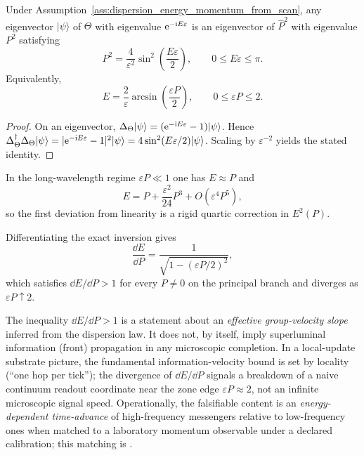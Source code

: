 \begin{proposition}
\label{prop:dispersion_exact}
\MathTag Under Assumption~\ref{ass:dispersion_energy_momentum_from_scan}, any eigenvector $|\psi\rangle$ of $\Theta$ with eigenvalue $\mathrm{e}^{-\mathrm{i} E\varepsilon}$ is an eigenvector of $\widehat{P}^2$ with eigenvalue $P^2$ satisfying
\[
P^2=\frac{4}{\varepsilon^2}\sin^2\!\left(\frac{E\varepsilon}{2}\right),
\qquad 0\le E\varepsilon\le\pi.
\]
Equivalently,
\[
E=\frac{2}{\varepsilon}\arcsin\!\left(\frac{\varepsilon P}{2}\right),
\qquad 0\le \varepsilon P\le 2.
\]
\end{proposition}
\begin{proof}
On an eigenvector, $\Delta_\Theta|\psi\rangle=(\mathrm{e}^{-\mathrm{i} E\varepsilon}-1)|\psi\rangle$.
Hence $\Delta_\Theta^\dagger\Delta_\Theta|\psi\rangle=|\mathrm{e}^{-\mathrm{i} E\varepsilon}-1|^2|\psi\rangle=4\sin^2(E\varepsilon/2)|\psi\rangle$.
Scaling by $\varepsilon^{-2}$ yields the stated identity.
\end{proof}

\begin{remark}
\label{rem:dispersion_low_energy_expansion}
\MathTag In the long-wavelength regime $\varepsilon P\ll 1$ one has $E\approx P$ and
\[
E
=P+\frac{\varepsilon^2}{24}P^3+O(\varepsilon^4P^5),
\]
so the first deviation from linearity is a rigid quartic correction in $E^2(P)$.
\end{remark}

\begin{proposition}
\label{prop:dispersion_group_velocity}
\MathTag Differentiating the exact inversion gives
\[
\frac{\dd E}{\dd P}=\frac{1}{\sqrt{1-(\varepsilon P/2)^2}},
\]
which satisfies $\dd E/\dd P>1$ for every $P\ne 0$ on the principal branch and diverges as $\varepsilon P\uparrow 2$.
\end{proposition}

\begin{remark}
\label{rem:dispersion_causality_defense}
\AuditTag The inequality $\dd E/\dd P>1$ is a statement about an \emph{effective group-velocity slope} inferred from the dispersion law.
It does not, by itself, imply superluminal information (front) propagation in any microscopic completion.
In a local-update substrate picture, the fundamental information-velocity bound is set by locality (``one hop per tick''); the divergence of $\dd E/\dd P$ signals a breakdown of a naive continuum readout coordinate near the zone edge $\varepsilon P\approx 2$, not an infinite microscopic signal speed.
Operationally, the falsifiable content is an \emph{energy-dependent time-advance} of high-frequency messengers relative to low-frequency ones when matched to a laboratory momentum observable under a declared calibration; this matching is \MatchTag.
\end{remark}

